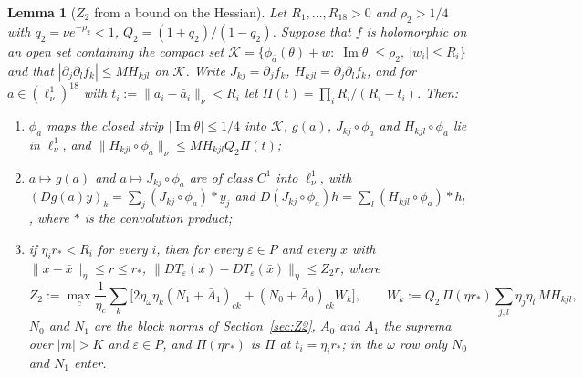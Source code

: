 \documentclass[11pt]{article}
\newtheorem{lemma}{Lemma}[section]
\theoremstyle{definition}
\newcommand{\im}{\operatorname{Im}}
\begin{document}
\begin{lemma}[$Z_2$ from a bound on the Hessian]\label{lem:hess}
Let $R_1, \dots, R_{18} > 0$ and $\rho_2 > 1/4$ with $q_2 = \nu e^{-\rho_2} < 1$, $Q_2 = (1 + q_2)/(1 - q_2)$. Suppose that $f$ is holomorphic on an open set containing the compact set $\mathcal K = \{\phi_{\bar a}(\theta) + w : |\im\theta| \le \rho_2,\ |w_i| \le R_i\}$ and that $|\partial_j\partial_lf_k| \le M\!H_{kjl}$ on $\mathcal K$. Write $J_{kj} = \partial_jf_k$, $H_{kjl} = \partial_j\partial_lf_k$, and for $a \in (\ell^1_\nu)^{18}$ with $t_i := \|a_i - \bar a_i\|_\nu < R_i$ let $\Pi(t) = \prod_iR_i/(R_i - t_i)$. Then:
\begin{enumerate}
\item[(a)] $\phi_a$ maps the closed strip $|\im\theta| \le 1/4$ into $\mathcal K$, $g(a)$, $J_{kj}\circ\phi_a$ and $H_{kjl}\circ\phi_a$ lie in $\ell^1_\nu$, and $\|H_{kjl}\circ\phi_a\|_\nu \le M\!H_{kjl}Q_2\Pi(t)$;
\item[(b)] $a \mapsto g(a)$ and $a \mapsto J_{kj}\circ\phi_a$ are of class $C^1$ into $\ell^1_\nu$, with $(Dg(a)y)_k = \sum_j(J_{kj}\circ\phi_a)*y_j$ and $D(J_{kj}\circ\phi_a)h = \sum_l(H_{kjl}\circ\phi_a)*h_l$, where $*$ is the convolution product;
\item[(c)] if $\eta_ir_* < R_i$ for every $i$, then for every $\varepsilon \in P$ and every $x$ with $\|x - \bar x\|_\eta \le r \le r_*$, $\|DT_\varepsilon(x) - DT_\varepsilon(\bar x)\|_\eta \le Z_2r$, where
\[ Z_2 := \max_c\frac1{\eta_c}\sum_k\big[2\eta_\omega\eta_k(N_1 + \bar A_1)_{ck} + (N_0 + \bar A_0)_{ck}W_k\big], \qquad W_k := Q_2\,\Pi(\eta r_*)\sum_{j,l}\eta_j\eta_l\,M\!H_{kjl}, \]
$N_0$ and $N_1$ are the block norms of Section~\ref{sec:Z2}, $\bar A_0$ and $\bar A_1$ the suprema over $|m| > K$ and $\varepsilon \in P$, and $\Pi(\eta r_*)$ is $\Pi$ at $t_i = \eta_ir_*$; in the $\omega$ row only $N_0$ and $N_1$ enter.
\end{enumerate}
\end{lemma}
\end{document}
